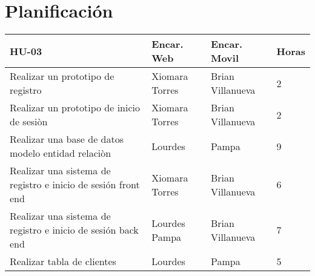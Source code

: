 \chapter{Planificación}
\centering
\begin{tabular}{ |p{4.5 cm}|p{2 cm}|p{2 cm}|p{1.5cm}|  }
	\hline
	\rowcolor{blue!40}  \centerline {HU-03} & \centerline {Encar. Web} & \centerline {Encar. Movil} & \centerline {Horas}\\  \hline
	
	Realizar un prototipo de registro &  Xiomara Torres  &   Brian Villanueva &  \centerline 2 \\   \hline
	
	Realizar un prototipo de inicio de sesiòn &  Xiomara Torres  &  Brian Villanueva & \centerline 2   \\   \hline
	
	Realizar una base de datos modelo entidad relaciòn &  Lourdes &  Pampa & \centerline 9    \\   \hline 
	
	Realizar una sistema de registro e inicio de sesión front end  &  Xiomara Torres &  Brian Villanueva & \centerline 6    \\   \hline 
	
	Realizar una sistema de registro e inicio de sesión back end  &  Lourdes Pampa &  Brian Villanueva & \centerline 7   \\   \hline 
	
	Realizar tabla de clientes	 &  Lourdes  &  Pampa & \centerline 5   \\   \hline 
	
\end{tabular}